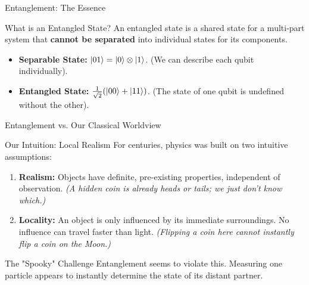 \documentclass{beamer}
\begin{document}

\begin{frame}[fragile]{Entanglement: The Essence}
    \begin{block}{What is an Entangled State?}
        An entangled state is a shared state for a multi-part system that \textbf{cannot be separated} into individual states for its components.
        \begin{itemize}
            \item \textbf{Separable State:} $\ket{01} = \ket{0} \otimes \ket{1}$.
            \newline (We can describe each qubit individually).
            \item \textbf{Entangled State:} $\frac{1}{\sqrt{2}}(\ket{00} + \ket{11})$.
            \newline (The state of one qubit is undefined without the other).
        \end{itemize}
    \end{block}
\end{frame}

\begin{frame}[fragile]{Entanglement vs. Our Classical Worldview}
    \begin{block}{Our Intuition: Local Realism}
        For centuries, physics was built on two intuitive assumptions:
        \begin{enumerate}
            \item \textbf{Realism:} Objects have definite, pre-existing properties, independent of observation.
            \newline\textit{(A hidden coin is already heads or tails; we just don't know which.)}
            
            \item \textbf{Locality:} An object is only influenced by its immediate surroundings. No influence can travel faster than light.
            \newline\textit{(Flipping a coin here cannot instantly flip a coin on the Moon.)}
        \end{enumerate}
    \end{block}

    \begin{alertblock}{The "Spooky" Challenge}
        Entanglement seems to violate this. Measuring one particle appears to instantly determine the state of its distant partner.
    \end{alertblock}
\end{frame}
\end{document}
